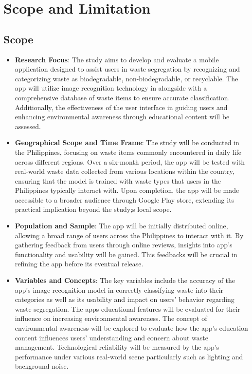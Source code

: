 \section{Scope and Limitation}

	\subsection{Scope}
	\begin{itemize}
		\item \textbf{Research Focus}: The study aims to develop and evaluate a mobile application designed to assist users in waste segregation by recognizing and categorizing waste as biodegradable, non-biodegradable, or recyclable. The app will utilize image recognition technology in alongside with a comprehensive database of waste items to ensure accurate classification. Additionally, the effectiveness of the user interface in guiding users and enhancing environmental awareness through educational content will be assessed.
		
		\item \textbf{Geographical Scope and Time Frame}: The study will be conducted in the Philippines, focusing on waste items commonly encountered in daily life across different regions. Over a six-month period, the app will be tested with real-world waste data collected from various locations within the country, ensuring that the model is trained with waste types that users in the Philippines typically interact with. Upon completion, the app will be made accessible to a broader audience through Google Play store, extending its practical implication beyond the study;s local scope.
		
		\item \textbf{Population and Sample}: The app will be initially distributed online, allowing a broad range of users across the Philippines to interact with it. By gathering feedback from users through online reviews, insights into app's functionality and usability will be gained. This feedbacks will be crucial in refining the app before its eventual release.
		
		\item \textbf{Variables and Concepts}: The key variables include the accuracy of the app's image recognition model in correctly classifying waste into their categories as well as its usability and impact on users'  behavior regarding waste segregation. The apps educational features will be evaluated for their influence on increasing environmental awareness. The concept of environmental awareness will be explored to evaluate how the app's education content influences users' understanding and concern about waste management. Technological reliability will be measured by the app's performance under various real-world scene particularly such as lighting and background noise.
		

\end{itemize}
